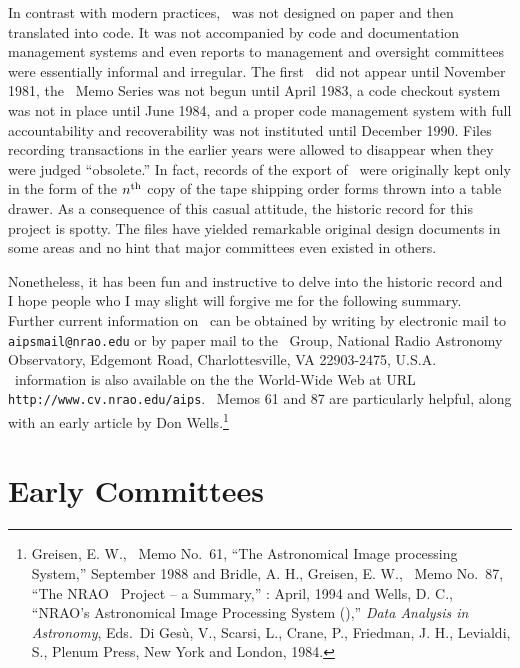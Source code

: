      In contrast with modern practices, \AIPS\ was not designed on
paper and then translated into code.  It was not accompanied by code
and documentation management systems and even reports to management
and oversight committees were essentially informal and irregular.  The
first \Aipsletter\ did not appear until November 1981, the \AIPS\ Memo
Series was not begun until April 1983, a code checkout system was not
in place until June 1984, and a proper code management system with
full accountability and recoverability was not instituted until
December 1990.  Files recording transactions in the earlier years were
allowed to disappear when they were judged ``obsolete.''  In fact,
records of the export of \AIPS\ were originally kept only in the form
of the $n^{{\rm th}}$ copy of the tape shipping order forms thrown into a
table drawer.  As a consequence of this casual attitude, the historic
record for this project is spotty.  The files have yielded remarkable
original design documents in some areas and no hint that major
committees even existed in others.

     Nonetheless, it has been fun and instructive to delve into the
historic record and I hope people who I may slight will forgive me for
the following summary.  Further current information on \AIPS\ can be
obtained by writing by electronic mail to {\tt aipsmail@nrao.edu} or
by paper mail to the \AIPS\ Group, National Radio Astronomy
Observatory, Edgemont Road,  Charlottesville, VA 22903-2475, U.S.A.
\AIPS\ information is also available on the the World-Wide Web at URL
{\tt http://www.cv.nrao.edu/aips}.  \AIPS\ Memos 61 and 87 are
particularly helpful, along with an early article by Don
Wells.\footnote{Greisen, E. W., \AIPS\ Memo No.~61, ``The Astronomical
Image processing System,'' September 1988 and Bridle, A. H., Greisen,
E. W., \AIPS\ Memo No.~87, ``The NRAO \AIPS\ Project -- a Summary,'' :
April, 1994 and Wells, D. C., ``NRAO's Astronomical Image Processing
System (\AIPS),'' {\it Data Analysis in Astronomy}, Eds.~Di Ges\`u, V.,
Scarsi, L., Crane, P., Friedman, J. H., Levialdi, S., Plenum Press,
New York and London, 1984.}

\section{Early Committees}

